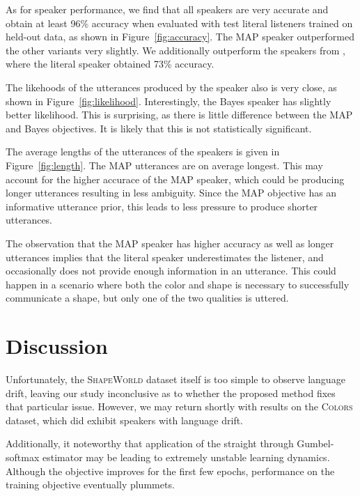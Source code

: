 \documentclass[11pt,a4paper]{article}
\begin{document}
As for speaker performance, we find that all speakers are very accurate
and obtain at least 96\% accuracy when evaluated with test literal listeners
trained on held-out data, as shown in Figure~\ref{fig:accuracy}.
The MAP speaker outperformed the other variants very slightly.
We additionally outperform the speakers from \citet{white2020learning},
where the literal speaker obtained 73\% accuracy.

The likehoods of the utterances produced by the speaker also is very close,
as shown in Figure~\ref{fig:likelihood}.
Interestingly, the Bayes speaker has slightly better likelihood.
This is surprising, as there is little difference between the MAP and Bayes
objectives. It is likely that this is not statistically significant.

The average lengths of the utterances of the speakers is given in Figure~\ref{fig:length}.
The MAP utterances are on average longest.
This may account for the higher accurace of the MAP speaker, which could be producing
longer utterances resulting in less ambiguity.
Since the MAP objective has an informative utterance prior, this leads to less
pressure to produce shorter utterances.

The observation that the MAP speaker has higher accuracy as well as longer utterances
implies that the literal speaker underestimates the listener, and occasionally
does not provide enough information in an utterance.
This could happen in a scenario where both the color and shape is necessary to 
successfully communicate a shape, but only one of the two qualities is uttered.

\section{Discussion}
Unfortunately, the \textsc{ShapeWorld} dataset itself is too simple to observe
language drift, leaving our study inconclusive as to whether the proposed
method fixes that particular issue.
However, we may return shortly with results on the \textsc{Colors} dataset,
which did exhibit speakers with language drift.

Additionally, it noteworthy that application of the straight through Gumbel-softmax
estimator may be leading to extremely unstable learning dynamics.
Although the objective improves for the first few epochs,
performance on the training objective eventually plummets.





   
\end{document}
